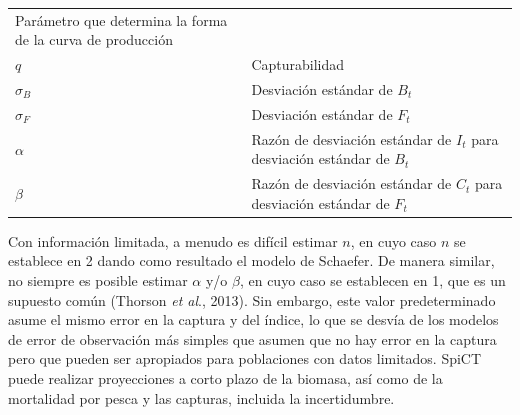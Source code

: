 \documentclass[
  spanish,
]{article}
\begin{document}
\begin{longtable}[]{@{}ll@{}}
\begin{minipage}[t]{0.80\columnwidth}
Parámetro que determina la forma de la curva de producción\strut
\end{minipage}\tabularnewline
\begin{minipage}[t]{0.14\columnwidth}\raggedright
\(q\)\strut
\end{minipage} & \begin{minipage}[t]{0.80\columnwidth}\raggedright
Capturabilidad\strut
\end{minipage}\tabularnewline
\begin{minipage}[t]{0.14\columnwidth}\raggedright
\(\sigma_B\)\strut
\end{minipage} & \begin{minipage}[t]{0.80\columnwidth}\raggedright
Desviación estándar de \(B_t\)\strut
\end{minipage}\tabularnewline
\begin{minipage}[t]{0.14\columnwidth}\raggedright
\(\sigma_F\)\strut
\end{minipage} & \begin{minipage}[t]{0.80\columnwidth}\raggedright
Desviación estándar de \(F_t\)\strut
\end{minipage}\tabularnewline
\begin{minipage}[t]{0.14\columnwidth}\raggedright
\(\alpha\)\strut
\end{minipage} & \begin{minipage}[t]{0.80\columnwidth}\raggedright
Razón de desviación estándar de \(I_t\) para desviación estándar de
\(B_t\)\strut
\end{minipage}\tabularnewline
\begin{minipage}[t]{0.14\columnwidth}\raggedright
\(\beta\)\strut
\end{minipage} & \begin{minipage}[t]{0.80\columnwidth}\raggedright
Razón de desviación estándar de \(C_t\) para desviación estándar de
\(F_t\)\strut
\end{minipage}\tabularnewline
\bottomrule
\end{longtable}

Con información limitada, a menudo es difícil estimar \(n\), en cuyo
caso \(n\) se establece en 2 dando como resultado el modelo de Schaefer.
De manera similar, no siempre es posible estimar \(\alpha\) y/o
\(\beta\), en cuyo caso se establecen en 1, que es un supuesto común
(Thorson \emph{et al}., 2013). Sin embargo, este valor predeterminado
asume el mismo error en la captura y del índice, lo que se desvía de los
modelos de error de observación más simples que asumen que no hay error
en la captura pero que pueden ser apropiados para poblaciones con datos
limitados. SpiCT puede realizar proyecciones a corto plazo de la
biomasa, así como de la mortalidad por pesca y las capturas, incluida la
incertidumbre.
\end{document}
